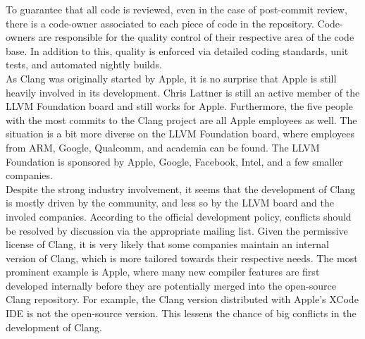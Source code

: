 To guarantee that all code is reviewed, even in the case of post-commit review, there is a code-owner associated to each piece of code in the repository. Code-owners are responsible for the quality control of their respective area of the code base. In addition to this, quality is enforced via detailed coding standards, unit tests, and automated nightly builds. \\

As Clang was originally started by Apple, it is no surprise that Apple is still heavily involved in its development. Chris Lattner is still an active member of the LLVM Foundation board and still works for Apple.\cite{lattner} Furthermore, the five people with the most commits to the Clang project are all Apple employees as well.\cite{clang-commits} The situation is a bit more diverse on the LLVM Foundation board, where employees from ARM, Google, Qualcomm, and academia can be found.\cite{llvm-board} The LLVM Foundation is sponsored by Apple, Google, Facebook, Intel, and a few smaller companies.\cite{llvm-sponsors} \\

Despite the strong industry involvement, it seems that the development of Clang is mostly driven by the community, and less so by the LLVM board and the involed companies. According to the official development policy, conflicts should be resolved by discussion via the appropriate mailing list.\cite{clang-policy} Given the permissive license of Clang, it is very likely that some companies maintain an internal version of Clang, which is more tailored towards their respective needs. The most prominent example is Apple, where many new compiler features are first developed internally before they are potentially merged into the open-source Clang repository. For example, the Clang version distributed with Apple's XCode IDE is not the open-source version. This lessens the chance of big conflicts in the development of Clang.


